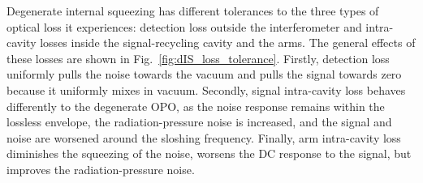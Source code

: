 
Degenerate internal squeezing has different tolerances to the three types of optical loss it experiences: detection loss outside the interferometer and intra-cavity losses inside the signal-recycling cavity and the arms. %
The general effects of these losses are shown in Fig.~\ref{fig:dIS_loss_tolerance}. Firstly, detection loss uniformly pulls the noise towards the vacuum and pulls the signal towards zero because it uniformly mixes in vacuum. Secondly, signal intra-cavity loss behaves differently to the degenerate OPO, as the noise response remains within the lossless envelope, the radiation-pressure noise is increased, and the signal and noise are worsened around the sloshing frequency. Finally, arm intra-cavity loss diminishes the squeezing of the noise, worsens the DC response to the signal, but improves the radiation-pressure noise.

